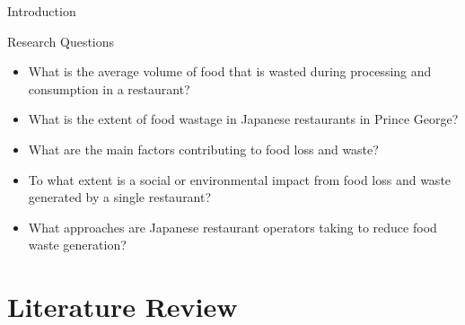 \documentclass{beamer}
\begin{document}
\begin{frame}{Introduction}
    \begin{block}{Research Questions}
        \begin{itemize}
            \item What is the average volume of food that is wasted during processing and consumption in a restaurant?
            \item What is the extent of food wastage in Japanese restaurants in Prince George?
            \item What are the main factors contributing to food loss and waste?
            \item To what extent is a social or environmental impact from food loss and waste generated by a single restaurant?
            \item What approaches are Japanese restaurant operators taking to reduce food waste generation?
        \end{itemize}
    \end{block}
\end{frame}

\section{Literature Review}
\end{document}

